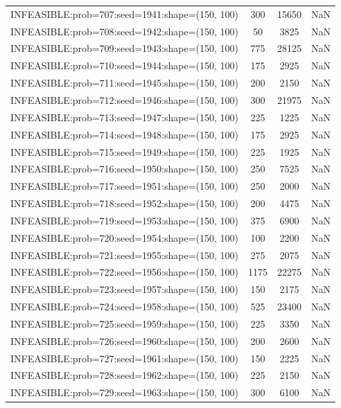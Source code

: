 \begin{longtable}{lccc}
INFEASIBLE:prob=707:seed=1941:shape=(150, 100) &      300 & 15650 &    NaN \\
INFEASIBLE:prob=708:seed=1942:shape=(150, 100) &       50 &  3825 &    NaN \\
INFEASIBLE:prob=709:seed=1943:shape=(150, 100) &      775 & 28125 &    NaN \\
INFEASIBLE:prob=710:seed=1944:shape=(150, 100) &      175 &  2925 &    NaN \\
INFEASIBLE:prob=711:seed=1945:shape=(150, 100) &      200 &  2150 &    NaN \\
INFEASIBLE:prob=712:seed=1946:shape=(150, 100) &      300 & 21975 &    NaN \\
INFEASIBLE:prob=713:seed=1947:shape=(150, 100) &      225 &  1225 &    NaN \\
INFEASIBLE:prob=714:seed=1948:shape=(150, 100) &      175 &  2925 &    NaN \\
INFEASIBLE:prob=715:seed=1949:shape=(150, 100) &      225 &  1925 &    NaN \\
INFEASIBLE:prob=716:seed=1950:shape=(150, 100) &      250 &  7525 &    NaN \\
INFEASIBLE:prob=717:seed=1951:shape=(150, 100) &      250 &  2000 &    NaN \\
INFEASIBLE:prob=718:seed=1952:shape=(150, 100) &      200 &  4475 &    NaN \\
INFEASIBLE:prob=719:seed=1953:shape=(150, 100) &      375 &  6900 &    NaN \\
INFEASIBLE:prob=720:seed=1954:shape=(150, 100) &      100 &  2200 &    NaN \\
INFEASIBLE:prob=721:seed=1955:shape=(150, 100) &      275 &  2075 &    NaN \\
INFEASIBLE:prob=722:seed=1956:shape=(150, 100) &     1175 & 22275 &    NaN \\
INFEASIBLE:prob=723:seed=1957:shape=(150, 100) &      150 &  2175 &    NaN \\
INFEASIBLE:prob=724:seed=1958:shape=(150, 100) &      525 & 23400 &    NaN \\
INFEASIBLE:prob=725:seed=1959:shape=(150, 100) &      225 &  3350 &    NaN \\
INFEASIBLE:prob=726:seed=1960:shape=(150, 100) &      200 &  2600 &    NaN \\
INFEASIBLE:prob=727:seed=1961:shape=(150, 100) &      150 &  2225 &    NaN \\
INFEASIBLE:prob=728:seed=1962:shape=(150, 100) &      225 &  2150 &    NaN \\
INFEASIBLE:prob=729:seed=1963:shape=(150, 100) &      300 &  6100 &    NaN \\

\end{longtable}
